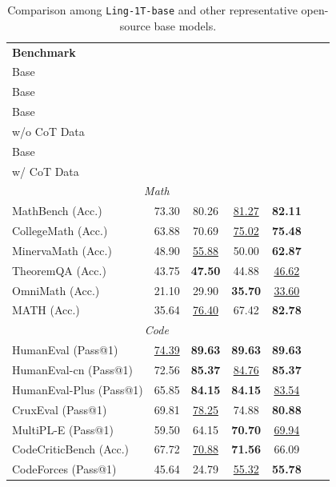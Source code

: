 \begin{table}[h]
\centering
\caption{{Comparison among \texttt{Ling-1T-base} and other representative open-source base models. }}
\label{tab:ling-1T-base-benchmarks}
\small
{
\begin{tabular}{lcccccc}
\toprule
\textbf{Benchmark} & \textbf{\splitcell{DeepSeek-V3.1 \\ Base}}  & \textbf{\splitcell{Kimi-K2 \\ Base}}  &  \textbf{\splitcell{\texttt{Ling-1T} \\ Base \\ w/o CoT Data}} & \textbf{\splitcell{\texttt{Ling-1T} \\ Base \\ w/ CoT Data}}\\
\midrule
\multicolumn{5}{c}{\textit{Math}} \\
\midrule

MathBench (Acc.) & 73.30 & 80.26 & \underline{81.27} & \textbf{82.11} \\
CollegeMath (Acc.) & 63.88 & 70.69 & \underline{75.02} & \textbf{75.48}\\
MinervaMath (Acc.) & 48.90 & \underline{55.88} & 50.00 & \textbf{62.87}\\

TheoremQA (Acc.) & 43.75 & \textbf{47.50} & 44.88 & \underline{46.62}\\
OmniMath (Acc.) & 21.10 & 29.90 & \textbf{35.70} & \underline{33.60}\\

MATH (Acc.) & 35.64 & \underline{76.40} & 67.42 & \textbf{82.78}\\
\midrule
\multicolumn{5}{c}{\textit{Code}} \\
\midrule
HumanEval (Pass@1) & \underline{74.39} & \textbf{89.63} & \textbf{89.63} & \textbf{89.63} \\
HumanEval-cn (Pass@1) & 72.56 & \textbf{85.37} & \underline{84.76} & \textbf{85.37} \\
HumanEval-Plus (Pass@1) & 65.85 & \textbf{84.15} & \textbf{84.15} & \underline{83.54}\\
CruxEval (Pass@1) & 69.81 & \underline{78.25} & 74.88 & \textbf{80.88}\\
MultiPL-E (Pass@1) & 59.50 & 64.15 & \textbf{70.70} & \underline{69.94}\\
CodeCriticBench (Acc.) & 67.72 & \underline{70.88} & \textbf{71.56} & 66.09 \\
CodeForces (Pass@1) & 45.64 & 24.79 & \underline{55.32} & \textbf{55.78} \\


\end{tabular}}
\end{table}
